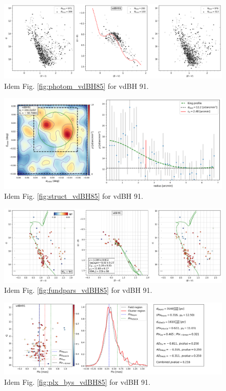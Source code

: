 \documentclass[referee]{aa}
\begin{document}
\begin{figure}[ht]
    \centering
    \includegraphics[width=\hsize]{../figs/obs_vdBH91.png}
    \caption{Idem Fig. \ref{fig:photom_vdBH85} for vdBH 91.}
    \label{fig27}
\end{figure}
\begin{figure}[ht]
    \centering
    \includegraphics[width=\hsize]{../figs/dmap_vdbh91.png}
    \caption{Idem Fig. \ref{fig:struct_vdBH85} for vdBH 91.}
    \label{fig28}
\end{figure}
\begin{figure}[ht]
    \centering
    \includegraphics[width=\hsize]{../figs/cmds_vdBH91.png}
    \caption{Idem Fig. \ref{fig:fundpars_vdBH85} for vdBH 91.}
    \label{fig29}
\end{figure}
\begin{figure}[ht]
    \centering
    \includegraphics[width=\hsize]{../figs/plx_vdBH91.png}
    \caption{Idem Fig. \ref{fig:plx_bys_vdBH85} for vdBH 91.}
    \label{fig30}
\end{figure}
\end{document}

